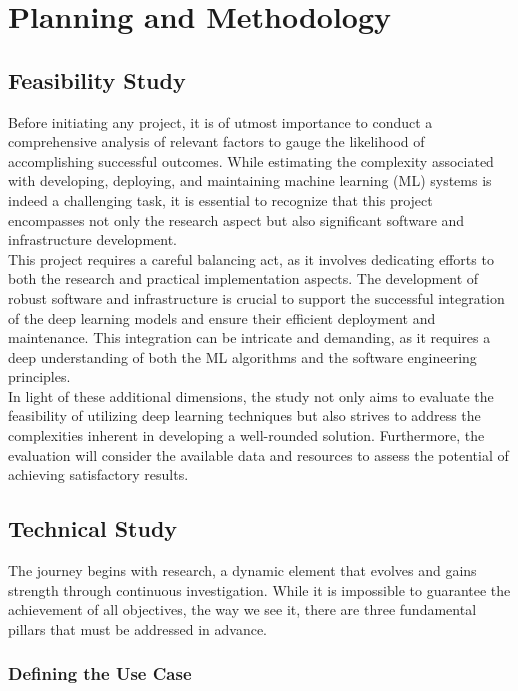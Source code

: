 \chapter{Planning and Methodology}
\label{cap:plan}

\section{Feasibility Study}

Before initiating any project, it is of utmost importance to conduct a comprehensive analysis of relevant factors to gauge the likelihood of accomplishing successful outcomes. While estimating the complexity associated with developing, deploying, and maintaining machine learning (ML) systems is indeed a challenging task, it is essential to recognize that this project encompasses not only the research aspect but also significant software and infrastructure development. \\

This project requires a careful balancing act, as it involves dedicating efforts to both the research and practical implementation aspects. The development of robust software and infrastructure is crucial to support the successful integration of the deep learning models and ensure their efficient deployment and maintenance. This integration can be intricate and demanding, as it requires a deep understanding of both the ML algorithms and the software engineering principles. \\

In light of these additional dimensions, the study not only aims to evaluate the feasibility of utilizing deep learning techniques but also strives to address the complexities inherent in developing a well-rounded solution. Furthermore, the evaluation will consider the available data and resources to assess the potential of achieving satisfactory results.

\section{Technical Study}

The journey begins with research,
a dynamic element that evolves and gains strength through continuous investigation.
While it is impossible to guarantee the achievement of all objectives, the way we see it,
there are three fundamental pillars that must be addressed in advance. \\

\subsection{Defining the Use Case}

